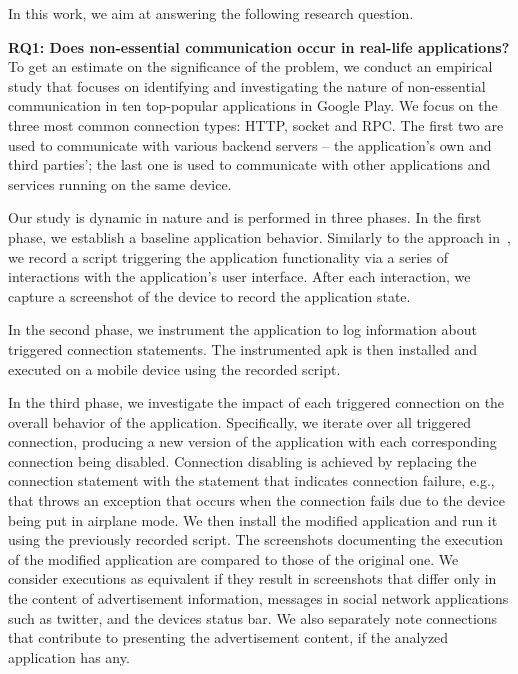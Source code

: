 In this work, we aim at answering the following research question. 

\vspace{0.1in}
\noindent 
{\bf RQ1: Does non-essential communication occur in real-life applications?}
To get an  estimate on the significance of the problem, we conduct an empirical study 
that focuses on identifying and investigating the nature of non-essential communication in ten top-popular applications in Google Play. 
We focus on the three most common connection types: HTTP, socket and RPC.
The first two are used to communicate with various backend servers -- the application's own and third parties'; 
the last one is used to communicate with other applications and services running on the same device.

Our study is dynamic in nature and is performed in three phases. 
In the first phase, we establish a baseline application behavior. 
Similarly to the approach in~\cite{Hornyack:Han:Jung:Schechter:Wetherall:CCS11}, we record a script triggering the application functionality via a series of interactions with the application's user interface. 
After each interaction, we capture a screenshot of the device to record the application state. 

In the second phase, we instrument the application to log information about 
triggered connection statements. The instrumented apk is then installed and executed on a mobile device using the recorded script. 

In the third phase, we investigate the impact of each triggered connection on the overall behavior of the application.
Specifically, we iterate over all triggered connection, producing a new version of the application with each corresponding connection being disabled. Connection disabling is achieved by replacing the connection statement with the
statement that indicates connection failure, e.g., that throws an exception that occurs when the connection fails due to the device being put in airplane mode. 
We then install the modified application and run it using the previously recorded script. The screenshots documenting 
the execution of the modified application are compared to those of the original one. We consider executions as equivalent if they result in screenshots that differ only in the content of advertisement information, messages in social network applications such as twitter, and the devices status bar. 
We also separately note connections that contribute to presenting the advertisement content, if the analyzed application has any. 

